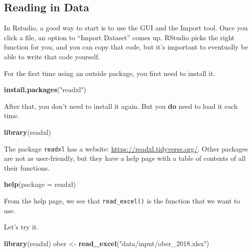 \documentclass[
]{book}
\newenvironment{Shaded}{\begin{snugshade}}{\end{snugshade}}
\newcommand{\DataTypeTok}[1]{\textcolor[rgb]{0.13,0.29,0.53}{#1}}
\newcommand{\KeywordTok}[1]{\textcolor[rgb]{0.13,0.29,0.53}{\textbf{#1}}}
\newcommand{\NormalTok}[1]{#1}
\newcommand{\StringTok}[1]{\textcolor[rgb]{0.31,0.60,0.02}{#1}}
\theoremstyle{definition}
\theoremstyle{definition}
\theoremstyle{definition}
\theoremstyle{remark}
\begin{document}
\hypertarget{reading-in-data}{%
\subsection{Reading in Data}\label{reading-in-data}}

In Rstudio, a good way to start is to use the GUI and the Import tool. Once you click a file, an option to ``Import Dataset'' comes up. RStudio picks the right function for you, and you can copy that code, but it's important to eventually be able to write that code yourself.

For the first time using an outside package, you first need to install it.

\begin{Shaded}
\begin{Highlighting}[]
\KeywordTok{install.packages}\NormalTok{(}\StringTok{"readxl"}\NormalTok{)}
\end{Highlighting}
\end{Shaded}

After that, you don't need to install it again. But you \textbf{do} need to load it each time.

\begin{Shaded}
\begin{Highlighting}[]
\KeywordTok{library}\NormalTok{(readxl)}
\end{Highlighting}
\end{Shaded}

The package \texttt{readxl} has a website: \url{https://readxl.tidyverse.org/}. Other packages are not as user-friendly, but they have a help page with a table of contents of all their functions.

\begin{Shaded}
\begin{Highlighting}[]
\KeywordTok{help}\NormalTok{(}\DataTypeTok{package =}\NormalTok{ readxl)}
\end{Highlighting}
\end{Shaded}

From the help page, we see that \texttt{read\_excel()} is the function that we want to use.

Let's try it.

\begin{Shaded}
\begin{Highlighting}[]
\KeywordTok{library}\NormalTok{(readxl)}
\NormalTok{ober <{-}}\StringTok{ }\KeywordTok{read\_excel}\NormalTok{(}\StringTok{"data/input/ober\_2018.xlsx"}\NormalTok{)}
\end{Highlighting}
\end{Shaded}
\end{document}
